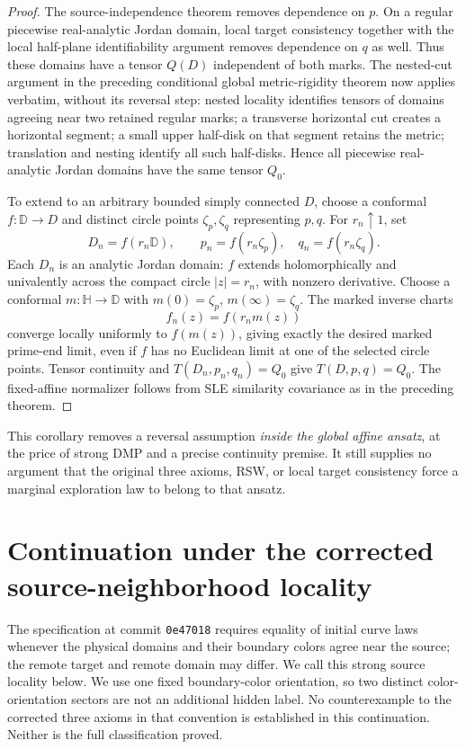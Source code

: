 \documentclass[11pt]{article}
\theoremstyle{definition}\newtheorem{definition}[theorem]{Definition}
\theoremstyle{remark}\newtheorem{remark}[theorem]{Remark}
\begin{document}
\begin{proof}
The source-independence theorem removes dependence on $p$.  On a regular
piecewise real-analytic Jordan domain, local target consistency together
with the local half-plane identifiability argument removes dependence on
$q$ as well.  Thus these domains have a tensor $Q(D)$ independent of both
marks.  The nested-cut argument in the preceding conditional global
metric-rigidity theorem now applies verbatim, without its reversal step:
nested locality identifies tensors of domains agreeing near two retained
regular marks; a transverse horizontal cut creates a horizontal segment;
a small upper half-disk on that segment retains the metric; translation
and nesting identify all such half-disks.  Hence all piecewise real-analytic
Jordan domains have the same tensor $Q_0$.

To extend to an arbitrary bounded simply connected $D$, choose a conformal
$f:\mathbb D\to D$ and distinct circle points $\zeta_p,\zeta_q$ representing
$p,q$.  For $r_n\uparrow1$, set
\[
 D_n=f(r_n\mathbb D),\qquad
 p_n=f(r_n\zeta_p),\quad q_n=f(r_n\zeta_q).
\]
Each $D_n$ is an analytic Jordan domain: $f$ extends holomorphically and
univalently across the compact circle $|z|=r_n$, with nonzero derivative.
Choose a conformal $m:\mathbb H\to\mathbb D$ with
$m(0)=\zeta_p$, $m(\infty)=\zeta_q$.  The marked inverse charts
\[
 f_n(z)=f(r_n m(z))
\]
converge locally uniformly to $f(m(z))$, giving exactly the desired marked
prime-end limit, even if $f$ has no Euclidean limit at one of the selected
circle points.  Tensor continuity and $T(D_n,p_n,q_n)=Q_0$ give
$T(D,p,q)=Q_0$.  The fixed-affine normalizer follows from SLE similarity
covariance as in the preceding theorem.
\end{proof}

This corollary removes a reversal assumption \emph{inside the global affine
ansatz}, at the price of strong DMP and a precise continuity premise.  It
still supplies no argument that the original three axioms, RSW, or local
target consistency force a marginal exploration law to belong to that ansatz.


\clearpage
\section{Continuation under the corrected source-neighborhood locality}
\label{sec:corrected-continuation}

The specification at commit \texttt{0e47018} requires equality of initial
curve laws whenever the physical domains and their boundary colors agree
near the source; the remote target and remote domain may differ. We call
this strong source locality below. We use one fixed boundary-color orientation,
so two distinct color-orientation sectors are not an additional hidden label.
No counterexample to the corrected three axioms in that convention is
established in this continuation. Neither is the full classification proved.
\end{document}
